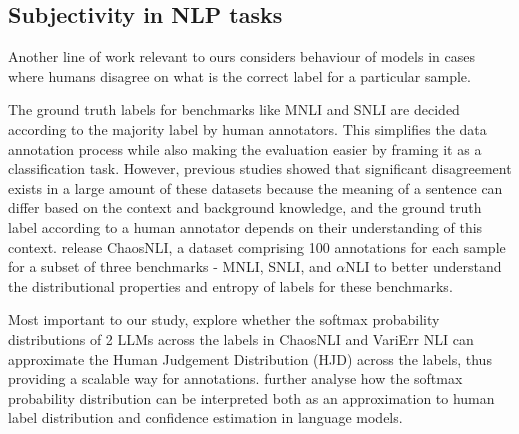

\subsection{Subjectivity in NLP tasks}
\label{related:subjectivity}
Another line of work relevant to ours considers behaviour of models in cases where humans disagree on what is the correct label for a particular sample. 

The ground truth labels for benchmarks like MNLI and SNLI are decided according to the majority label by human annotators. 
This simplifies the data annotation process while also making the evaluation easier by framing it as a classification task. 
However, previous studies \citep{pavlick-kwiatkowski-2019-inherent, nie-etal-2020-learn} showed that significant disagreement exists in a large amount of these datasets because the meaning of a sentence can differ based on the context and background knowledge, and the ground truth label according to a human annotator depends on their understanding of this context. 
\citet{nie-etal-2020-learn} release ChaosNLI, a dataset comprising 100 annotations for each sample for a subset of three benchmarks - MNLI, SNLI, and $\alpha$NLI to better understand the distributional properties and entropy of labels for these benchmarks.

Most important to our study, \citet{chen2024seeingbig} explore whether the softmax probability distributions of 2 LLMs across the labels in ChaosNLI \citep{nie-etal-2020-learn} and VariErr NLI \citep{weber-genzel-etal-2024-varierr} can approximate the Human Judgement Distribution (HJD) across the labels, thus providing a scalable way for annotations. 
\citet{baan-etal-2024-interpreting} further analyse how the softmax probability distribution can be interpreted both as an approximation to human label distribution and confidence estimation in language models.



